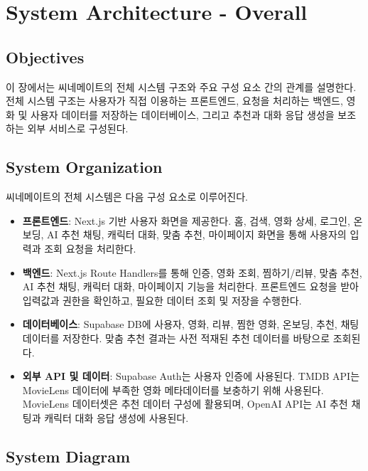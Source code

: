 \documentclass[11pt,a4paper]{article}
\providecommand{\tightlist}{%
  \setlength{\itemsep}{0.25em}\setlength{\parskip}{0.1em}}
\begin{document}
\hypertarget{system-architecture---overall}{%
\section{System Architecture - Overall}\label{system-architecture---overall}}

\hypertarget{objectives-1}{%
\subsection{Objectives}\label{objectives-1}}

이 장에서는 씨네메이트의 전체 시스템 구조와 주요 구성 요소 간의 관계를 설명한다. 전체 시스템 구조는 사용자가 직접 이용하는 프론트엔드, 요청을 처리하는 백엔드, 영화 및 사용자 데이터를 저장하는 데이터베이스, 그리고 추천과 대화 응답 생성을 보조하는 외부 서비스로 구성된다.

\hypertarget{system-organization}{%
\subsection{System Organization}\label{system-organization}}

씨네메이트의 전체 시스템은 다음 구성 요소로 이루어진다.

\begin{itemize}
\tightlist
\item
  \textbf{프론트엔드}: Next.js 기반 사용자 화면을 제공한다. 홈, 검색, 영화 상세, 로그인, 온보딩, AI 추천 채팅, 캐릭터 대화, 맞춤 추천, 마이페이지 화면을 통해 사용자의 입력과 조회 요청을 처리한다.
\item
  \textbf{백엔드}: Next.js Route Handlers를 통해 인증, 영화 조회, 찜하기/리뷰, 맞춤 추천, AI 추천 채팅, 캐릭터 대화, 마이페이지 기능을 처리한다. 프론트엔드 요청을 받아 입력값과 권한을 확인하고, 필요한 데이터 조회 및 저장을 수행한다.
\item
  \textbf{데이터베이스}: Supabase DB에 사용자, 영화, 리뷰, 찜한 영화, 온보딩, 추천, 채팅 데이터를 저장한다. 맞춤 추천 결과는 사전 적재된 추천 데이터를 바탕으로 조회된다.
\item
  \textbf{외부 API 및 데이터}: Supabase Auth는 사용자 인증에 사용된다. TMDB API는 MovieLens 데이터에 부족한 영화 메타데이터를 보충하기 위해 사용된다. MovieLens 데이터셋은 추천 데이터 구성에 활용되며, OpenAI API는 AI 추천 채팅과 캐릭터 대화 응답 생성에 사용된다.
\end{itemize}

\hypertarget{system-diagram}{%
\subsection{System Diagram}\label{system-diagram}}
\end{document}
